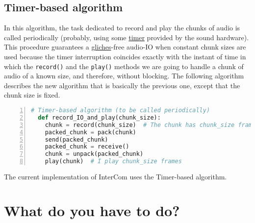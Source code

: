 \subsection{Timer-based algorithm}

In this algorithm, the task dedicated to record and play the chunks of
audio is called periodically (probably, using some
\href{https://en.wikipedia.org/wiki/Timer}{timer} provided by the
sound hardware). This procedure guarantees a
\href{https://en.wikipedia.org/wiki/Glitch}{gliches}-free audio-IO
when constant chunk sizes are used because the timer interruption
coincides exactly with the instant of time in which the
\verb|record()| and the \verb|play()| methods we are going to handle a
chunk of audio of a known size, and therefore, without blocking. The following
algorithm describes the new algorithm that is basically the previous
one, except that the chunk size is fixed.

\begin{lstlisting}[language=Python,numbers=left]
  # Timer-based algorithm (to be called periodically)
  def record_IO_and_play(chunk_size):
    chunk = record(chunk_size)  # The chunk has chunk_size frames
    packed_chunk = pack(chunk)
    send(packed_chunk)
    packed_chunk = receive()
    chunk = unpack(packed_chunk)
    play(chunk)  # I play chunk_size frames
\end{lstlisting}


The current implementation of InterCom uses the Timer-based algorithm.

\section{What do you have to do?}

